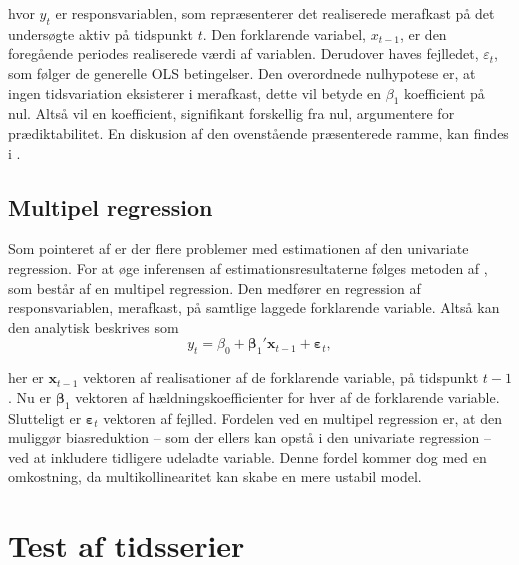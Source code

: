 \documentclass[
  a4paper,
  oneside]{memoir}
\begin{document}
hvor \(y_t\) er responsvariablen, som repræsenterer det realiserede merafkast på det undersøgte aktiv på tidspunkt \(t\). Den forklarende variabel, \(x_{t-1}\), er den foregående periodes realiserede værdi af variablen. Derudover haves fejlledet, \(\varepsilon_t\), som følger de generelle OLS betingelser. Den overordnede nulhypotese er, at ingen tidsvariation eksisterer i merafkast, dette vil betyde en \(\beta_1\) koefficient på nul. Altså vil en koefficient, signifikant forskellig fra nul, argumentere for prædiktabilitet. En diskusion af den ovenstående præsenterede ramme, kan findes i \citep{Stambaugh1999}.

\hypertarget{multregr}{%
\subsection{Multipel regression}\label{multregr}}

Som pointeret af \citep{Stambaugh1999} er der flere problemer med estimationen af den univariate regression. For at øge inferensen af estimationsresultaterne følges metoden af \citep{Goyal2007}, som består af en multipel regression. Den medfører en regression af responsvariablen, merafkast, på samtlige laggede forklarende variable. Altså kan den analytisk beskrives som
\[y_t=\beta_0+\bm{\beta}_1'\bm{x}_{t-1}+\bm{\varepsilon}_t,\]

her er \(\bm{x}_{t-1}\) vektoren af realisationer af de forklarende variable, på tidspunkt \(t-1\). Nu er \(\bm{\beta}_1\) vektoren af hældningskoefficienter for hver af de forklarende variable. Slutteligt er \(\bm{\varepsilon}_t\) vektoren af fejlled. Fordelen ved en multipel regression er, at den muliggør biasreduktion -- som der ellers kan opstå i den univariate regression -- ved at inkludere tidligere udeladte variable. Denne fordel kommer dog med en omkostning, da multikollinearitet kan skabe en mere ustabil model.

\hypertarget{sektestaftids}{%
\section{Test af tidsserier}\label{sektestaftids}}
\end{document}

